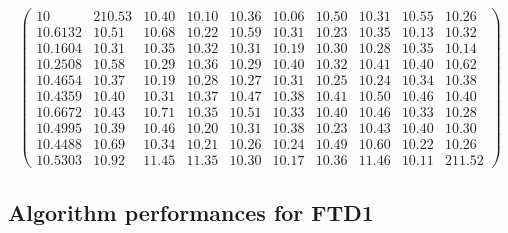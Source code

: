 \documentclass[12pt,oneside,a4paper]{article}
\begin{document}
\begin{equation}
  \tag{Mean Tabu Duration for each city (alpha = 5 and 100 cities)}
  \begin{pmatrix} 10 & 210.53 & 10.40 & 10.10 & 10.36 & 10.06 & 10.50 & 10.31 & 10.55 & 10.26 \\
    10.6132 & 10.51 & 10.68 & 10.22 & 10.59 & 10.31 & 10.23 & 10.35 & 10.13 & 10.32 \\
    10.1604 & 10.31 & 10.35 & 10.32 & 10.31 & 10.19 & 10.30 & 10.28 & 10.35 & 10.14 \\
    10.2508 & 10.58 & 10.29 & 10.36 & 10.29 & 10.40 & 10.32 & 10.41 & 10.40 & 10.62 \\
    10.4654 & 10.37 & 10.19 & 10.28 & 10.27 & 10.31 & 10.25 & 10.24 & 10.34 & 10.38 \\
    10.4359 & 10.40 & 10.31 & 10.37 & 10.47 & 10.38 & 10.41 & 10.50 & 10.46 & 10.40 \\
    10.6672 & 10.43 & 10.71 & 10.35 & 10.51 & 10.33 & 10.40 & 10.46 & 10.33 & 10.28 \\
    10.4995 & 10.39 & 10.46 & 10.20 & 10.31 & 10.38 & 10.23 & 10.43 & 10.40 & 10.30 \\
    10.4488 & 10.69 & 10.34 & 10.21 & 10.26 & 10.24 & 10.49 & 10.60 & 10.22 & 10.26 \\
    10.5303 & 10.92 & 11.45 & 11.35 & 10.30 & 10.17 & 10.36 & 11.46 & 10.11 & 211.52
  \end{pmatrix}
\end{equation}

\newpage
\begin{table}[h]
  \caption{Average of the results for the four runs with FTD1}
\end{table}

\subsection{Algorithm performances for FTD1}
\end{document}
